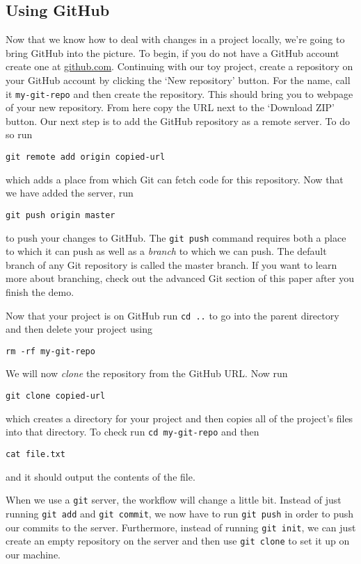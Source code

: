 \documentclass[notitlepage]{simple}
\begin{document}

\subsection{Using GitHub}

Now that we know how to deal with changes in a project locally, we're going to bring GitHub into the picture.
To begin, if you do not have a GitHub account create one at \url{github.com}.
Continuing with our toy project, create a repository on your GitHub account by clicking the `New repository' button.
For the name, call it \verb|my-git-repo| and then create the repository.
This should bring you to webpage of your new repository.
From here copy the URL next to the `Download ZIP' button.
Our next step is to add the GitHub repository as a remote server.
To do so run
\begin{terminal}
	\verb|git remote add origin copied-url|
\end{terminal}
which adds a place from which Git can fetch code for this repository.
Now that we have added the server, run
\begin{terminal}
	\verb|git push origin master|
\end{terminal}
to push your changes to GitHub.
The \verb|git push| command requires both a place to which it can push as well as a \textit{branch} to which we can push.
The default branch of any Git repository is called the master branch.
If you want to learn more about branching, check out the advanced Git section of this paper after you finish the demo.

Now that your project is on GitHub run \verb|cd ..| to go into the parent directory and then delete your project using
\begin{terminal}
	\verb|rm -rf my-git-repo|
\end{terminal}
We will now \textit{clone} the repository from the GitHub URL.
Now run
\begin{terminal}
	\verb|git clone copied-url|
\end{terminal}
which creates a directory for your project and then copies all of the project's files into that directory.
To check run \verb|cd my-git-repo| and then
\begin{terminal}
	\verb|cat file.txt|
\end{terminal}
and it should output the contents of the file.

When we use a \verb|git| server, the workflow will change a little bit.
Instead of just running \verb|git add| and \verb|git commit|, we now have to run \verb|git push| in order to push our commits to the server.
Furthermore, instead of running \verb|git init|, we can just create an empty repository on the server and then use \verb|git clone| to set it up on our machine.
\end{document}

